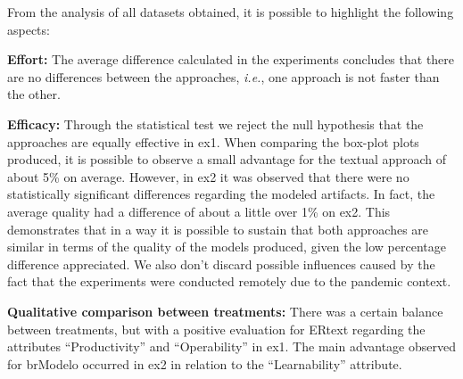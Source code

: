 From the analysis of all datasets obtained, it is possible to highlight the following aspects:

\item \textbf{Effort:} The average difference calculated in the experiments concludes that there are no differences between the approaches, \textit{i.e.}, one approach is not faster than the other.

\item \textbf{Efficacy:} Through the statistical test we reject the null hypothesis that the approaches are equally effective in \ac{ex1}.
When comparing the box-plot plots produced, it is possible to observe a small advantage for the textual approach of about 5\% on average.
However, in \ac{ex2} it was observed that there were no statistically significant differences regarding the modeled artifacts.
In fact, the average quality had a difference of about a little over 1\% on \ac{ex2}.
This demonstrates that in a way it is possible to sustain that both approaches are similar in terms of the quality of the models produced, given the low percentage difference appreciated.
We also don’t discard possible influences caused by the fact that the experiments were conducted remotely due to the pandemic context.

\item \textbf{Qualitative comparison between treatments:} There was a certain balance between treatments, but with a positive evaluation for ERtext regarding the attributes ``Productivity'' and ``Operability'' in \ac{ex1}.
The main advantage observed for brModelo occurred in \ac{ex2} in relation to the ``Learnability'' attribute.


